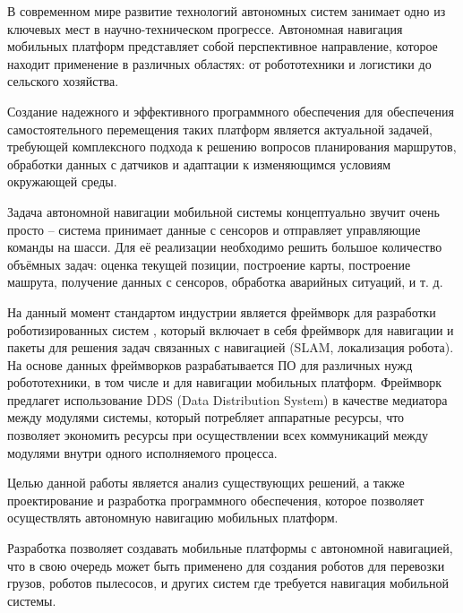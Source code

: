 В современном мире развитие технологий автономных систем занимает одно из
ключевых мест в научно-техническом прогрессе. Автономная навигация мобильных
платформ представляет собой перспективное направление, которое находит
применение в различных областях: от робототехники и логистики до сельского
хозяйства.

Создание надежного и эффективного программного обеспечения для обеспечения
самостоятельного перемещения таких платформ является актуальной задачей,
требующей комплексного подхода к решению вопросов планирования маршрутов,
обработки данных с датчиков и адаптации к изменяющимся условиям окружающей
среды.

Задача автономной навигации мобильной системы концептуально звучит очень
просто -- система принимает данные с сенсоров и отправляет управляющие команды
на шасси. Для её реализации необходимо решить большое количество объёмных
задач: оценка текущей позиции, построение карты, построение машрута, получение
данных с сенсоров, обработка аварийных ситуаций, и т. д.

На данный момент стандартом индустрии является фреймворк для разработки
роботизированных систем \ros, который включает в себя фреймворк для навигации и
пакеты для решения задач связанных с навигацией (SLAM, локализация робота).
На основе данных фреймворков разрабатывается ПО для различных нужд
робототехники, в том числе и для навигации мобильных платформ. Фреймворк
предлагет использование DDS (Data Distribution System) в качестве медиатора
между модулями системы, который потребляет аппаратные ресурсы, что позволяет
экономить ресурсы при осуществлении всех коммуникаций между модулями внутри
одного исполняемого процесса.

Целью данной работы является анализ существующих решений, а также
проектирование и разработка программного обеспечения, которое позволяет
осуществлять автономную навигацию мобильных платформ.

Разработка \diplomanameR{} позволяет создавать мобильные платформы с автономной
навигацией, что в свою очередь может быть применено для создания роботов для
перевозки грузов, роботов пылесосов, и других систем где требуется навигация
мобильной системы.
